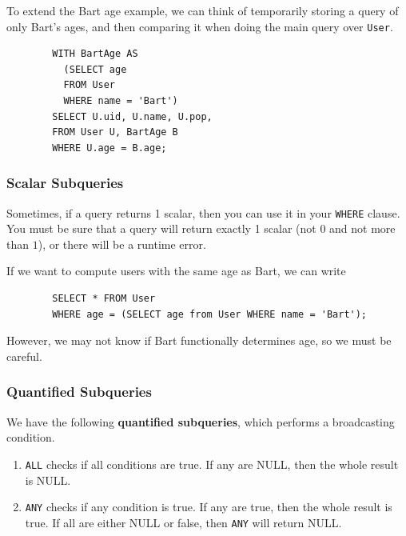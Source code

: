     \begin{example}
      To extend the Bart age example, we can think of temporarily storing a query of only Bart's ages, and then comparing it when doing the main query over \texttt{User}. 
      \begin{lstlisting}
        WITH BartAge AS 
          (SELECT age 
          FROM User 
          WHERE name = 'Bart') 
        SELECT U.uid, U.name, U.pop, 
        FROM User U, BartAge B 
        WHERE U.age = B.age; 
      \end{lstlisting}
    \end{example}

  \subsubsection{Scalar Subqueries}
    
    \begin{definition}
      Sometimes, if a query returns 1 scalar, then you can use it in your \texttt{WHERE} clause. You must be sure that a query will return exactly 1 scalar (not $0$ and not more than $1$), or there will be a runtime error.  
    \end{definition}

    \begin{example}
      If we want to compute users with the same age as Bart, we can write 
      \begin{lstlisting}
        SELECT * FROM User 
        WHERE age = (SELECT age from User WHERE name = 'Bart'); 
      \end{lstlisting}
      However, we may not know if Bart functionally determines age, so we must be careful. 
    \end{example}

  \subsubsection{Quantified Subqueries}

    \begin{definition}
      We have the following \textbf{quantified subqueries}, which performs a broadcasting condition. 
      \begin{enumerate}
        \item \texttt{ALL} checks if all conditions are true. If any are NULL, then the whole result is NULL. 
        \item \texttt{ANY} checks if any condition is true. If any are true, then the whole result is true. If all are either NULL or false, then \texttt{ANY} will return NULL. 
      \end{enumerate}
    \end{definition}

